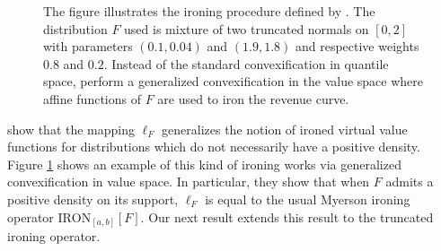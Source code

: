 \begin{figure}[h]
    \centering
    \caption{The figure illustrates the ironing procedure defined by \citet{monteiro2010optimal}. The distribution $F$ used is mixture of two truncated normals on $[0,2]$ with parameters $(0.1,0.04)$ and $(1.9,1.8)$ and respective weights $0.8$ and $0.2$. Instead of the standard convexification in quantile space, \cite{monteiro2010optimal} perform a generalized convexification in the value space where affine functions of $F$ are used to iron the revenue curve.}
    \label{fig:monteiro}
    \end{figure}


\citet{monteiro2010optimal} show that the mapping $\ell_F$ generalizes the notion of ironed virtual value functions for distributions which do not necessarily have a positive density. Figure \ref{fig:monteiro} shows an example of this kind of ironing works via generalized convexification in value space. In particular, they show that when $F$ admits a positive density on its support, $\ell_F$ is equal to the usual Myerson ironing operator $\mathrm{IRON}_{[a,b]}[F].$ Our next result extends this result to the truncated ironing operator.

